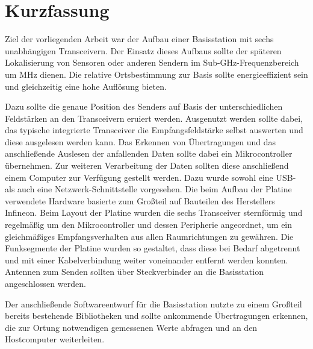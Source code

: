 
\chapter*{Kurzfassung}
\label{sec:kurzfassung}
\pagestyle{scrheadings}

Ziel der vorliegenden Arbeit war der Aufbau einer Basisstation mit sechs unabhängigen Transceivern. Der Einsatz dieses Aufbaus sollte der späteren Lokalisierung von Sensoren oder anderen Sendern im Sub-GHz-Frequenzbereich um \unit[868]{MHz} dienen. Die relative Ortsbestimmung zur Basis sollte energieeffizient sein und gleichzeitig eine hohe Auflösung bieten. 

Dazu sollte die genaue Position des Senders auf Basis der unterschiedlichen Feldstärken an den Transceivern eruiert werden. Ausgenutzt werden sollte dabei, das typische integrierte Transceiver die Empfangsfeldstärke selbst auswerten und diese ausgelesen werden kann. Das Erkennen von Übertragungen und das anschließende Auslesen der anfallenden Daten sollte dabei ein Mikrocontroller übernehmen. Zur weiteren Verarbeitung der Daten sollten diese anschließend einem Computer zur Verfügung gestellt werden. Dazu wurde sowohl eine USB- als auch eine Netzwerk-Schnittstelle vorgesehen. Die beim Aufbau der Platine verwendete Hardware basierte zum Großteil auf Bauteilen des Herstellers Infineon. 
Beim Layout der Platine wurden die sechs Transceiver sternförmig und regelmäßig um den Mikrocontroller und dessen Peripherie angeordnet, um ein gleichmäßiges Empfangsverhalten aus allen Raumrichtungen zu gewähren. Die Funksegmente der Platine wurden so gestaltet, dass diese bei Bedarf abgetrennt und mit einer Kabelverbindung weiter voneinander entfernt werden konnten. Antennen zum Senden sollten über Steckverbinder an die Basisstation angeschlossen werden.

Der anschließende Softwareentwurf für die Basisstation nutzte zu einem Großteil bereits bestehende Bibliotheken und sollte ankommende Übertragungen erkennen, die zur Ortung notwendigen gemessenen Werte abfragen und an den Hostcomputer weiterleiten. 

